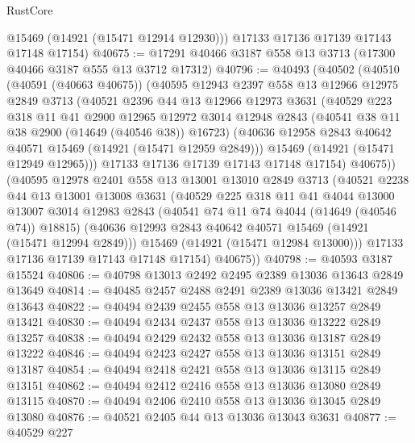 \begin{lexlean}{RustCore}
\begin{coremodule}
        @15469
        (@14921 (@15471 @12914 @12930)))
      @17133
      @17136
      @17139
      @17143
      @17148
      @17154)
@40675 := @17291 @40466 @3187 @558 @13 @3713 (@17300 @40466 @3187 @555 @13 @3712 @17312)
@40796 := @40493
    (@40502
      (@40510
        (@40591 (@40663 @40675))
        (@40595
          @12943
          @2397
          @558
          @13
          @12966
          @12975
          @2849
          @3713
          (@40521
            @2396
            @44
            @13
            @12966
            @12973
            @3631
            (@40529
              @223
              @318
              @11
              @41
              @2900
              @12965
              @12972
              @3014
              @12948
              @2843
              (@40541 @38 @11 @38 @2900 (@14649 (@40546 @38)) @16723)
              (@40636 @12958 @2843 @40642 @40571 @15469 (@14921 (@15471 @12959 @2849)))
              @15469
              (@14921 (@15471 @12949 @12965)))
            @17133
            @17136
            @17139
            @17143
            @17148
            @17154)
          @40675))
      (@40595
        @12978
        @2401
        @558
        @13
        @13001
        @13010
        @2849
        @3713
        (@40521
          @2238
          @44
          @13
          @13001
          @13008
          @3631
          (@40529
            @225
            @318
            @11
            @41
            @4044
            @13000
            @13007
            @3014
            @12983
            @2843
            (@40541 @74 @11 @74 @4044 (@14649 (@40546 @74)) @18815)
            (@40636 @12993 @2843 @40642 @40571 @15469 (@14921 (@15471 @12994 @2849)))
            @15469
            (@14921 (@15471 @12984 @13000)))
          @17133
          @17136
          @17139
          @17143
          @17148
          @17154)
        @40675))
@40798 := @40593 @3187 @15524
@40806 := @40798 @13013 @2492 @2495 @2389 @13036 @13643 @2849 @13649
@40814 := @40485 @2457 @2488 @2491 @2389 @13036 @13421 @2849 @13643
@40822 := @40494 @2439 @2455 @558 @13 @13036 @13257 @2849 @13421
@40830 := @40494 @2434 @2437 @558 @13 @13036 @13222 @2849 @13257
@40838 := @40494 @2429 @2432 @558 @13 @13036 @13187 @2849 @13222
@40846 := @40494 @2423 @2427 @558 @13 @13036 @13151 @2849 @13187
@40854 := @40494 @2418 @2421 @558 @13 @13036 @13115 @2849 @13151
@40862 := @40494 @2412 @2416 @558 @13 @13036 @13080 @2849 @13115
@40870 := @40494 @2406 @2410 @558 @13 @13036 @13045 @2849 @13080
@40876 := @40521 @2405 @44 @13 @13036 @13043 @3631
@40877 := @40529 @227

\end{coremodule}
\end{lexlean}
